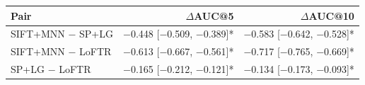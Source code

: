 \begin{tabular}{lrr}
\toprule
Pair & $\Delta$AUC@5 & $\Delta$AUC@10 \\
\midrule
SIFT+MNN $-$ SP+LG & $-$0.448 [$-$0.509, $-$0.389]* & $-$0.583 [$-$0.642, $-$0.528]* \\
SIFT+MNN $-$ LoFTR & $-$0.613 [$-$0.667, $-$0.561]* & $-$0.717 [$-$0.765, $-$0.669]* \\
SP+LG $-$ LoFTR & $-$0.165 [$-$0.212, $-$0.121]* & $-$0.134 [$-$0.173, $-$0.093]* \\
\bottomrule
\end{tabular}